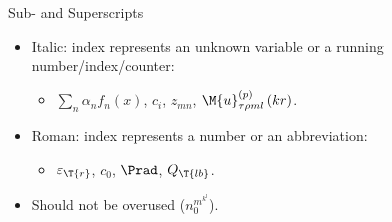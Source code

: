 \documentclass[xcolor=dvipsnames, aspectratio=169, handout, intlimits]{beamer}
\begin{document}
\begin{frame}{Sub- and Superscripts}

\vspace{-0.5cm}
\begin{itemize}
	\item \textcolor{elmagLight}{Italic}: index represents an unknown variable or a running number/index/counter:
	\begin{itemize}
		\item $\sum_n \alpha_n f_n \left(x\right)$, $c_i$, $z_{mn}$, $\M{u}_{\tau \rho m l}^{\left(p\right)} \left(kr\right)$.
	\end{itemize}
	\item \textcolor{elmagLight}{Roman}: index represents a number or an abbreviation:
	\begin{itemize}
		\item $\varepsilon_\T{r}$, $c_0$, $\Prad$, $Q_\T{lb}$.
	\end{itemize}
	\item Should not be overused ($n^{m^{k^{l}}}_0$).
\end{itemize}

\vspace{0.25cm}

\end{frame}
\end{document}
